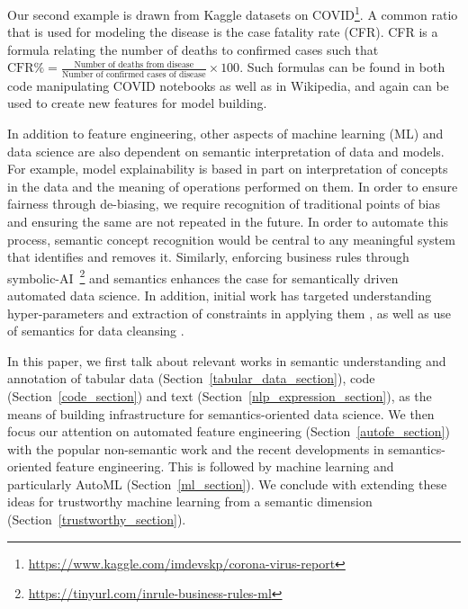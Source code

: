\documentclass[sigconf]{acmart}
\begin{document}
Our second example is drawn from Kaggle datasets on COVID\footnote{\url{https://www.kaggle.com/imdevskp/corona-virus-report}}.  A common ratio that is used for modeling the disease is the case fatality rate (CFR).  CFR is a formula relating the number of deaths to confirmed cases such that ${\text{CFR}}{\%}={\frac {\text{Number of deaths from disease}}{\text{Number of confirmed cases of disease}}}\times 100$.   Such formulas can be found in both code manipulating COVID notebooks as well as in Wikipedia, and again can be used to create new features for model building.

In addition to feature engineering, other aspects of machine learning (ML) and data science are also dependent on semantic interpretation of data and models. For example, model explainability is based in part on interpretation of concepts in the data and the meaning of operations performed on them. In order to ensure fairness through de-biasing, we require recognition of traditional points of bias~\cite{mehrabi2021survey} and ensuring the same are not repeated in the future. In order to automate this process, semantic concept recognition would be central to any meaningful system that identifies and removes it. Similarly, enforcing business rules through symbolic-AI~\footnote{\url{https://tinyurl.com/inrule-business-rules-ml}}%
and semantics enhances the case for semantically driven automated data science.  In addition, initial work has targeted understanding hyper-parameters and extraction of constraints in applying them \cite{hpodoc}, as well as use of semantics for data cleansing \cite{6982731}.  

In this paper, we first talk about relevant works in semantic understanding and annotation of tabular data (Section~\ref{tabular_data_section}), code (Section~\ref{code_section}) and text (Section~\ref{nlp_expression_section}), as the means of building infrastructure for semantics-oriented data science. 
We then focus our attention on automated feature engineering (Section~\ref{autofe_section}) with the popular non-semantic work and the recent developments in semantics-oriented feature engineering. 
This is followed by machine learning and particularly AutoML (Section~\ref{ml_section}).
We conclude with extending these ideas for trustworthy machine learning from a semantic dimension (Section~\ref{trustworthy_section}). %
\end{document}
